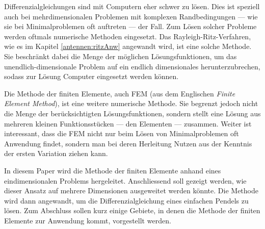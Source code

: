 %
%
%
%



Differenzialgleichungen sind mit Computern eher schwer zu lösen. 
Dies ist speziell auch bei mehrdimensionalen Problemen mit komplexen Randbedingungen --- wie sie bei Minimalproblemen oft auftreten --- der Fall. 
Zum Lösen solcher Probleme werden oftmals numerische Methoden eingesetzt. 
Das Rayleigh-Ritz-Verfahren, wie es im Kapitel \ref{antennen:ritzAnw} angewandt wird, ist eine solche Methode.
Sie beschränkt dabei die Menge der möglichen Lösungsfunktionen, um das unendlich-dimensionale Problem auf ein endlich dimensionales herunterzubrechen, sodass zur Lösung Computer eingesetzt werden können. 

Die Methode der finiten Elemente, auch FEM (aus dem Englischen {\em Finite Element Method}), ist eine weitere numerische Methode.
Sie begrenzt jedoch nicht die Menge der berücksichtigten Lösungsfunktionen, sondern stellt eine Lösung aus mehreren kleinen Funktionsstücken --- den Elementen --- zusammen.
Weiter ist interessant, dass die FEM nicht nur beim Lösen von Minimalproblemen oft Anwendung findet, sondern man bei deren Herleitung Nutzen aus der Kenntnis der ersten Variation ziehen kann. 

In diesem Paper wird die Methode der finiten Elemente anhand eines eindimensionalen Problems hergeleitet. 
Anschliessend soll gezeigt werden, wie dieser Ansatz auf mehrere Dimensionen ausgeweitet werden könnte. 
Die Methode wird dann angewandt, um die Differenzialgleichung eines einfachen Pendels zu lösen. 
Zum Abschluss sollen kurz einige Gebiete, in denen die Methode der finiten Elemente zur Anwendung kommt, vorgestellt werden.
